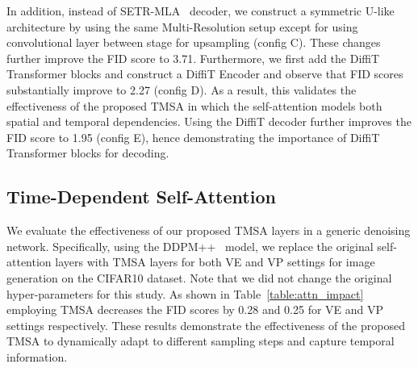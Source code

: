 \begin{table}
\centering
{}
    \caption{Impact of TMSA as a standalone module in other denoising networks.}
    \label{table:attn_impact}
\end{table}



In addition, instead of SETR-MLA~\cite{zheng2021rethinking} decoder, we construct a symmetric U-like architecture by using the same Multi-Resolution setup except for using convolutional layer between stage for upsampling (config C). These changes further improve the FID score to 3.71. Furthermore, we first add the DiffiT Transformer blocks and construct a DiffiT Encoder and observe that FID scores substantially improve to 2.27 (config D). As a result, this validates the effectiveness of the proposed TMSA in which the self-attention models both spatial and temporal dependencies. Using the DiffiT decoder further improves the FID score to 1.95 (config E), hence demonstrating the importance of DiffiT Transformer blocks for decoding.


\subsection{Time-Dependent Self-Attention}
\label{sec:abl-temporal-effect}
We evaluate the effectiveness of our proposed TMSA layers in a generic denoising network. Specifically, using the DDPM++~\cite{song2020score} model, we replace the original self-attention layers with TMSA layers for both VE and VP settings for image generation on the CIFAR10 dataset. Note that we did not change the 
original hyper-parameters for this study. As shown in Table~\ref{table:attn_impact} employing TMSA decreases the FID scores by 0.28 and 0.25 for VE and VP settings respectively. These results demonstrate the effectiveness of the proposed TMSA to dynamically adapt to different sampling steps and capture temporal information.   









